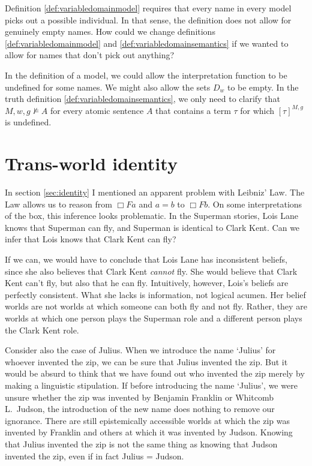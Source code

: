 \begin{exercise}
  Definition \ref{def:variabledomainmodel} requires that every name in every
  model picks out a possible individual. In that sense, the definition does not
  allow for genuinely empty names. How could we change definitions
  \ref{def:variabledomainmodel} and \ref{def:variabledomainsemantics} if we
  wanted to allow for names that don't pick out anything?
\end{exercise}
\begin{solution}
  In the definition of a model, we could allow the interpretation function to be
  undefined for some names. We might also allow the sets $D_{w}$ to be empty. In
  the truth definition \ref{def:variabledomainsemantics}, we only need to
  clarify that $M,w,g \not\models A$ for every atomic sentence $A$ that contains a
  term $\tau$ for which $[\tau]^{M,g}$ is undefined.
\end{solution}

\section{Trans-world identity}\label{sec:twi}

In section \ref{sec:identity} I mentioned an apparent problem with Leibniz' Law.
The Law allows us to reason from $\Box Fa$ and $a\!=\!b$ to $\Box Fb$. On some
interpretations of the box, this inference looks problematic. In the Superman
stories, Lois Lane knows that Superman can fly, and Superman is identical to
Clark Kent. Can we infer that Lois knows that Clark Kent can fly?

If we can, we would have to conclude that Lois Lane has inconsistent beliefs,
since she also believes that Clark Kent \emph{cannot} fly. She would believe
that Clark Kent can't fly, but also that he can fly. Intuitively, however,
Lois's beliefs are perfectly consistent. What she lacks is information, not
logical acumen. Her belief worlds are not worlds at which someone can both fly
and not fly. Rather, they are worlds at which one person plays the Superman role
and a different person plays the Clark Kent role.

Consider also the case of Julius. When we introduce the name `Julius' for
whoever invented the zip, we can be sure that Julius invented the zip. But it
would be absurd to think that we have found out who invented the zip merely by
making a linguistic stipulation. If before introducing the name `Julius', we
were unsure whether the zip was invented by Benjamin Franklin or Whitcomb L.\
Judson, the introduction of the new name does nothing to remove our ignorance.
There are still epistemically accessible worlds at which the zip was invented by
Franklin and others at which it was invented by Judson. Knowing that Julius
invented the zip is not the same thing as knowing that Judson invented the zip,
even if in fact Julius = Judson.

